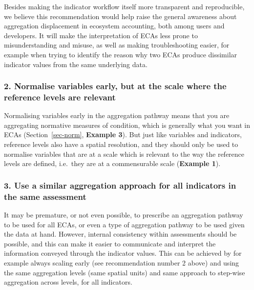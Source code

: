 \documentclass[
  authoryear,
  preprint,
  3p]{elsarticle}
\begin{document}
Besides making the indicator workflow itself more transparent and
reproducible, we believe this recommendation would help raise the
general awareness about aggregation displacement in ecosystem
accounting, both among users and developers. It will make the
interpretation of ECAs less prone to misunderstanding and misuse, as
well as making troubleshooting easier, for example when trying to
identify the reason why two ECAs produce dissimilar indicator values
from the same underlying data.

\subsubsection*{2. Normalise variables early, but at the scale where the
reference levels are
relevant}\label{normalise-variables-early-but-at-the-scale-where-the-reference-levels-are-relevant}

Normalising variables early in the aggregation pathway means that you
are aggregating normative measures of condition, which is generally what
you want in ECAs (Section~\ref{sec-norm}, \textbf{Example 3}). But just
like variables and indicators, reference levels also have a spatial
resolution, and they should only be used to normalise variables that are
at a scale which is relevant to the way the reference levels are
defined, i.e.~they are at a commensurable scale (\textbf{Example 1}).

\subsubsection*{3. Use a similar aggregation approach for all indicators
in the same
assessment}\label{use-a-similar-aggregation-approach-for-all-indicators-in-the-same-assessment}

It may be premature, or not even possible, to prescribe an aggregation
pathway to be used for all ECAs, or even a type of aggregation pathway
to be used given the data at hand. However, internal consistency within
assessments should be possible, and this can make it easier to
communicate and interpret the information conveyed through the indicator
values. This can be achieved by for example always scaling early (see
recommendation number 2 above) and using the same aggregation levels
(same spatial units) and same approach to step-wise aggregation across
levels, for all indicators.
\end{document}
